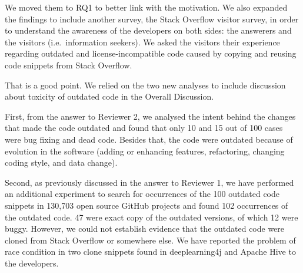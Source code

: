 \documentclass[a4paper,twoside,10pt]{reviewresponse}
\begin{document}

We moved them to RQ1 to better link with the motivation. We also expanded the findings to include another survey, the Stack Overflow visitor survey, in order to understand the awareness of the developers on both sides: the answerers and the visitors (i.e.~information seekers). We asked the visitors their experience regarding outdated and license-incompatible code caused by copying and reusing code snippets from Stack Overflow.


That is a good point. We relied on the two new analyses to include discussion about toxicity of outdated code in the Overall Discussion. 

First, from the answer to Reviewer 2, we analysed the intent behind the changes that made the code outdated and found that only 10 and 15 out of 100 cases were bug fixing and dead code. Besides that, the code were outdated because of evolution in the software (adding or enhancing features, refactoring, changing coding style, and data change).

Second, as previously discussed in the answer to Reviewer 1, we have performed an additional experiment to search for occurrences of the 100 outdated code snippets in 130,703 open source GitHub projects and found 102 occurrences of the outdated code. 47 were exact copy of the outdated versions, of which 12 were buggy. However, we could not establish evidence that the outdated code were cloned from Stack Overflow or somewhere else. We have reported the problem of race condition in two clone snippets found in deeplearning4j and Apache Hive to the developers.
\end{document}
